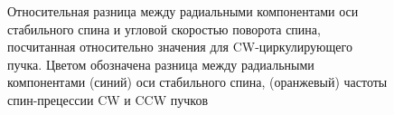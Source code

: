\begin{figure}[H]
	\centering
\end{figure}
\begin{figure}[H]\centering
	\caption{Относительная разница между радиальными компонентами оси стабильного спина и угловой скоростью поворота спина, посчитанная относительно значения для CW-циркулирующего пучка.\label{fig:Lin_test_rel_diff}
	Цветом обозначена разница между радиальными компонентами (синий) оси стабильного спина, (оранжевый) частоты спин-прецессии CW и CCW пучков}
\end{figure}
